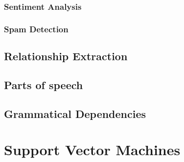 \subsubsection{Sentiment Analysis}

\subsubsection{Spam Detection}


\subsection{Relationship Extraction}\label{sec:RE}

\subsection{Parts of speech}

\subsection{Grammatical Dependencies}

\section{Support Vector Machines}\label{sec:SVM}
